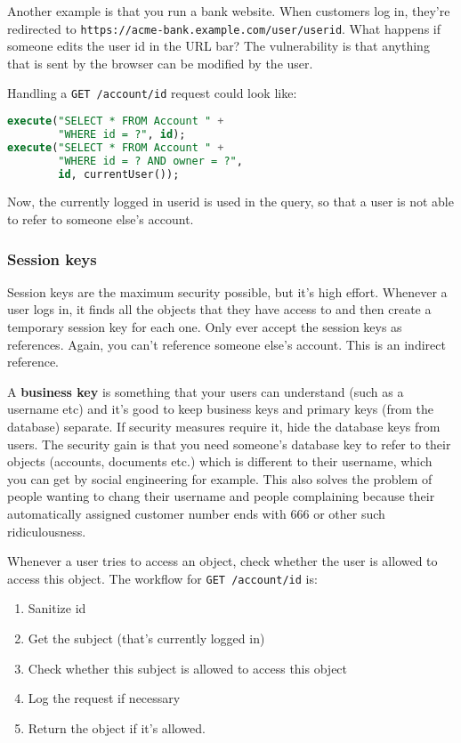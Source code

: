 \documentclass[11pt,a4paper,titlepage,dvipsnames,cmyk]{scrartcl}
\begin{document}
Another example is that you run a bank website. When customers log in,
they're redirected to
\lstinline|https://acme-bank.example.com/user/userid|. What happens if
someone edits the user id in the URL bar? The vulnerability is that
anything that is sent by the browser can be modified by the user.

Handling a \lstinline|GET /account/id| request could look like:

\begin{lstlisting}[language=SQL]
execute("SELECT * FROM Account " +
        "WHERE id = ?", id);
execute("SELECT * FROM Account " +
        "WHERE id = ? AND owner = ?",
        id, currentUser());
\end{lstlisting}

Now, the currently logged in userid is used in the query, so that a user
is not able to refer to someone else's account.

\subsubsection{Session keys}%
\label{ssub:Session keys}
Session keys are the maximum security possible, but it's high effort.
Whenever a user logs in, it finds all the objects that they have access to
and then create a temporary session key for each one. Only ever accept the
session keys as references. Again, you can't reference someone else's
account. This is an indirect reference.

A \textbf{business key} is something that your users can understand (such
as a username etc) and it's good to keep business keys and primary keys
(from the database) separate. If security measures require it, hide the
database keys from users. The security gain is that you need someone's
database key to refer to their objects (accounts, documents etc.) which is
different to their username, which you can get by social engineering for
example. This also solves the problem of people wanting to chang their
username and people complaining because their automatically assigned
customer number ends with 666 or other such ridiculousness.

Whenever a user tries to access an object, check whether the user is
allowed to access this object. The workflow for \lstinline|GET /account/id| 
is:

\begin{enumerate}
    \item Sanitize id
    \item Get the subject (that's currently logged in)
    \item Check whether this subject is allowed to access this object
    \item Log the request if necessary
    \item Return the object if it's allowed.
\end{enumerate}
\end{document}
